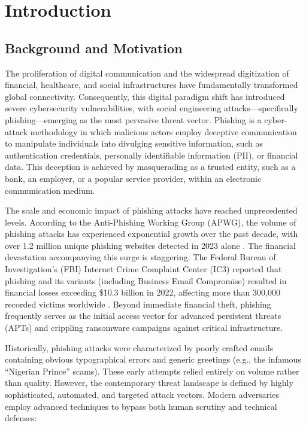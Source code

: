\chapter{Introduction}
\label{chapter-1-introduction}

\section{Background and Motivation}\label{background-and-motivation}

The proliferation of digital communication and the widespread
digitization of financial, healthcare, and social infrastructures have
fundamentally transformed global connectivity. Consequently, this
digital paradigm shift has introduced severe cybersecurity
vulnerabilities, with social engineering attacks---specifically
phishing---emerging as the most pervasive threat vector. Phishing is a
cyber-attack methodology in which malicious actors employ deceptive
communication to manipulate individuals into divulging sensitive
information, such as authentication credentials, personally identifiable
information (PII), or financial data. This deception is achieved by
masquerading as a trusted entity, such as a bank, an employer, or a
popular service provider, within an electronic communication medium.

The scale and economic impact of phishing attacks have reached
unprecedented levels. According to the Anti-Phishing Working Group
(APWG), the volume of phishing attacks has experienced exponential
growth over the past decade, with over 1.2 million unique phishing
websites detected in 2023 alone \cite{apwg2023}. The financial devastation
accompanying this surge is staggering. The Federal Bureau of
Investigation's (FBI) Internet Crime Complaint Center (IC3) reported
that phishing and its variants (including Business Email Compromise)
resulted in financial losses exceeding \$10.3 billion in 2022, affecting
more than 300,000 recorded victims worldwide \cite{fbi2022}. Beyond immediate
financial theft, phishing frequently serves as the initial access vector
for advanced persistent threats (APTs) and crippling ransomware
campaigns against critical infrastructure.

Historically, phishing attacks were characterized by poorly crafted
emails containing obvious typographical errors and generic greetings
(e.g., the infamous ``Nigerian Prince'' scams). These early attempts
relied entirely on volume rather than quality. However, the contemporary
threat landscape is defined by highly sophisticated, automated, and
targeted attack vectors. Modern adversaries employ advanced techniques
to bypass both human scrutiny and technical defenses:

